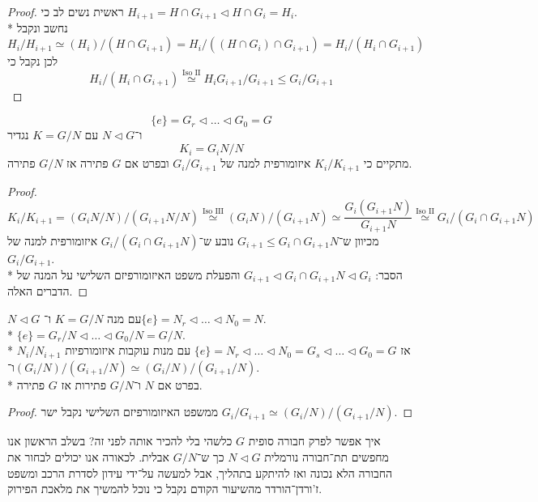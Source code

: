 \begin{proof}
	ראשית נשים לב כי $H_{i + 1} = H \cap G_{i + 1} \triangleleft H \cap G_i = H_i$. \\*
	נחשב ונקבל
	\[
		H_i / H_{i + 1} \simeq (H_i) / (H \cap G_{i + 1})
		= H_i / ((H \cap G_i) \cap G_{i + 1})
		= H_i / (H_i \cap G_{i + 1})
	\]
	לכן נקבל כי
	\[
		H_i / (H_i \cap G_{i + 1}) \overset{\text{Iso II}}{\simeq} H_i G_{i + 1} / G_{i + 1} \le G_i / G_{i + 1}
	\]
\end{proof}
\begin{lemma}
	\[
		\{e\} = G_r \triangleleft \dots \triangleleft G_0 = G
	\]
	ו־$N \triangleleft G$ עם $K = G/N$ נגדיר
	\[
		K_i = G_i N / N
	\]
	מתקיים כי $K_i / K_{i + 1}$ איזומורפית למנה של $G_i / G_{i + 1}$ ובפרט אם $G$ פתירה אז $G/N$ פתירה.
\end{lemma}
\begin{proof}
	\[
		K_i / K_{i + 1}
		= (G_i N / N) / (G_{i + 1}N / N)
		\overset{\text{Iso III}}{\simeq} 
		(G_i N) / (G_{i + 1} N)
		\simeq
		\frac{G_i (G_{i + 1} N)}{G_{i + 1} N}
		\overset{\text{Iso II}}{\simeq} 
		G_i / (G_i \cap G_{i + 1} N)
	\]
	מכיוון ש־$G_{i + 1} \le G_i \cap G_{i + 1} N$ נובע ש־$G_i / (G_i \cap G_{i + 1} N)$ איזומורפית למנה של $G_i / G_{i + 1}$. \\*
	הסבר: $G_{i + 1} \triangleleft G_i \cap G_{i + 1} N \triangleleft G_i$ והפעלת משפט האיזומורפיזם השלישי על המנה של הדברים האלה.
\end{proof}
\begin{lemma}
	$N \triangleleft G$ עם מנה $K = G / N$ ו־$\{e\} = N_r \triangleleft \dots \triangleleft N_0 = N$. \\*
	$\{e\} = G_r / N \triangleleft \dots \triangleleft G_0 / N = G/N$. \\*
	אז $\{e\} = N_r \triangleleft \dots \triangleleft N_0 = G_s \triangleleft \dots \triangleleft G_0 = G$
	עם מנות עוקבות איזומורפיות $N_i / N_{i + 1}$ ו־$(G_i/N) / (G_{i + 1}/N) \simeq (G_i / N)/(G_{i + 1} / N)$. \\*
	בפרט אם $N$ ו־$G / N$ פתירות אז $G$ פתירה.
\end{lemma}
\begin{proof}
	ממשפט האיזומורפיזם השלישי נקבל ישר $G_i / G_{i + 1} \simeq (G_i / N) / (G_{i + 1} / N)$.
\end{proof}
איך אפשר לפרק חבורה סופית $G$ כלשהי בלי להכיר אותה לפני זה?
בשלב הראשון אנו מחפשים תת־חבורה נורמלית $N \triangleleft G$ כך ש־$G/N$ אבלית.
לכאורה אנו יכולים לבחור את החבורה הלא נכונה ואז להיתקע בתהליך, אבל למעשה על־ידי עידון לסדרת הרכב ומשפט ז'ורדן־הורדר מהשיעור הקודם נקבל כי נוכל להמשיך את מלאכת הפירוק.
